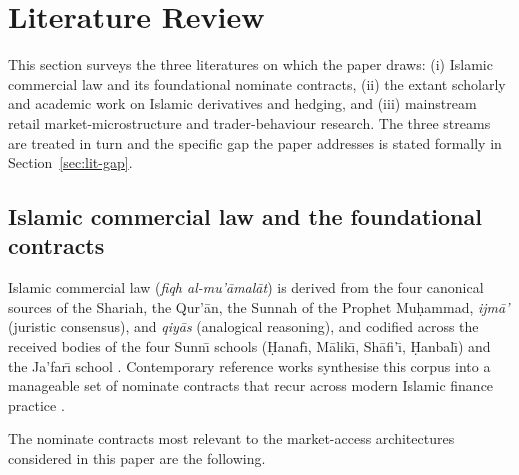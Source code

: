 \documentclass[preprint,12pt,authoryear]{elsarticle}
\theoremstyle{definition}
\begin{document}
\section{Literature Review}
\label{sec:literature}

This section surveys the three literatures on which the paper draws:
(i) Islamic commercial law and its foundational nominate contracts,
(ii) the extant scholarly and academic work on Islamic derivatives and
hedging, and (iii) mainstream retail market-microstructure and
trader-behaviour research. The three streams are treated in turn and
the specific gap the paper addresses is stated formally in
Section~\ref{sec:lit-gap}.

\subsection{Islamic commercial law and the foundational contracts}
\label{sec:lit-fiqh}

Islamic commercial law (\emph{fiqh al-mu'\={a}mal\={a}t}) is derived
from the four canonical sources of the Shariah, the Qur'\={a}n, the
Sunnah of the Prophet Mu\d{h}ammad, \emph{ijm\={a}'} (juristic
consensus), and \emph{qiy\={a}s} (analogical reasoning), and codified
across the received bodies of the four Sunn\={\i} schools
(\d{H}anaf\={\i}, M\={a}lik\={\i}, Sh\={a}fi'\={\i}, \d{H}anbal\={\i})
and the Ja'far\={\i} school \citep{Kamali2000,Vogel1998}. Contemporary
reference works synthesise this corpus into a manageable set of
nominate contracts that recur across modern Islamic finance practice
\citep{Usmani2002,ElGamal2006,Ayub2007,Iqbal2011}.

The nominate contracts most relevant to the market-access architectures
considered in this paper are the following.
\end{document}
